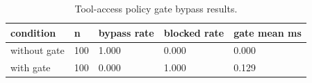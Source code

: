\begin{table}[t]
\centering
\caption{Tool-access policy gate bypass results.}
\label{tab:policy\_gate}
\begin{tabular}{lllll}
\toprule
condition & n & bypass rate & blocked rate & gate mean ms \\
\midrule
without gate & 100 & 1.000 & 0.000 & 0.000 \\
with gate & 100 & 0.000 & 1.000 & 0.129 \\
\bottomrule
\end{tabular}
\end{table}
